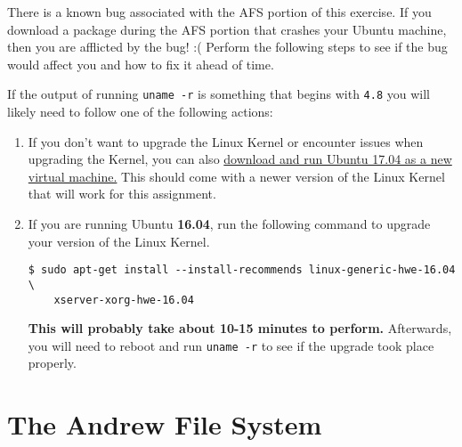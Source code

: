 \documentclass{article}
\begin{document}
\begin{mdframed}
\textbf{\color{red}{!!! IMPORTANT NOTE !!!}}

There is a known bug associated with the AFS portion of this exercise. If you
download a package during the AFS portion that crashes your Ubuntu machine, then
you are afflicted by the bug! :( Perform the following steps to see if the
bug would affect you and how to fix it ahead of time.

If the output of running \texttt{uname -r} is something that begins with
\texttt{4.8} you will likely need to follow one of the following actions:

\begin{enumerate}

    \item
        If you don't want to upgrade the Linux Kernel or encounter issues when
        upgrading the Kernel, you can also
        \href{https://www.ubuntu.com/download/desktop}{download and run Ubuntu
        17.04 as a new virtual machine.} This should come with a newer version
        of the Linux Kernel that will work for this assignment.

    \item
        If you are running Ubuntu \textbf{16.04}, run the following command to
        upgrade your version of the Linux Kernel.

\begin{lstlisting}
$ sudo apt-get install --install-recommends linux-generic-hwe-16.04 \
    xserver-xorg-hwe-16.04
\end{lstlisting}

        \textbf{This will probably take about 10-15 minutes to perform.}
        Afterwards, you will need to reboot and run \texttt{uname -r} to see if
        the upgrade took place properly.
\end{enumerate}


\end{mdframed}


\section*{The Andrew File System}
\end{document}
